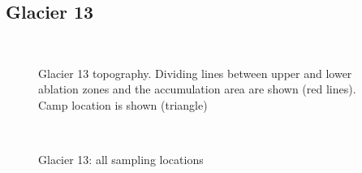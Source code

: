 \documentclass{sfuthesis}
\begin{document}
{\begin{appendices}
\section*{Glacier 13}
	\begin{figure}[H]
	\centering
	\\
\caption[]{Glacier 13 topography. Dividing lines between upper and lower ablation zones and the accumulation area are shown (red lines). Camp location is shown (triangle) }
\end{figure}
	\begin{figure}[H]
	\centering
	\\
\caption[]{Glacier 13: all sampling locations}
\end{figure}

\end{appendices}}
\end{document}
